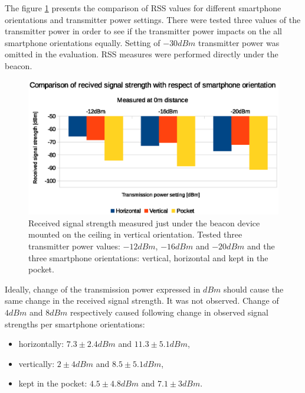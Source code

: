 \documentclass[../main.tex]{subfiles}
\begin{document}
The figure \ref{fig:tests_case3_rssi_vs_smartphone_orientation} presents the comparison of RSS values for different smartphone orientations and transmitter power settings.
There were tested three values of the transmitter power in order to see if the transmitter power impacts on the all smartphone orientations equally. Setting of $-30dBm$ transmitter power was omitted in the evaluation. RSS measures were performed directly under the beacon.

\begin{figure}[!htbp]
\includegraphics[width=\textwidth, keepaspectratio]{pictures/tests_case3_rssi_vs_smartphone_orientation}
\centering
\caption{Received signal strength measured just under the beacon device mounted on the ceiling in vertical orientation. Tested three transmitter power values: $-12dBm$, $-16dBm$ and $-20dBm$ and the three smartphone orientations: vertical, horizontal and kept in the pocket.}
\label{fig:tests_case3_rssi_vs_smartphone_orientation}
\end{figure}

Ideally, change of the transmission power expressed in $dBm$ should cause the same change in the received signal strength. It was not observed. Change of $4 dBm$ and $8 dBm$ respectively caused following change in observed signal strengths per smartphone orientations:
\begin{itemize}
	\item horizontally: $7.3\pm2.4 dBm$ and $11.3\pm5.1 dBm$,
	\item vertically: $2\pm4 dBm$ and $8.5\pm5.1 dBm$,
	\item kept in the pocket: $4.5\pm4.8 dBm$ and $7.1\pm3 dBm$.
\end{itemize}
\end{document}

